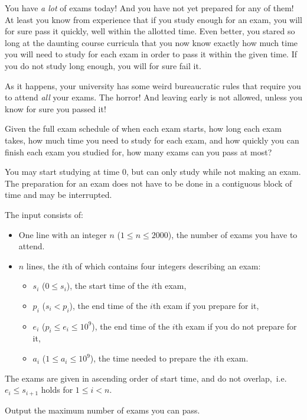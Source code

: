 

\newcommand{\maxn}{2000}
\newcommand{\maxtime}{10^9}
\newcommand{\maxa}{10^9}

You have \emph{a lot} of exams today! And you have not yet prepared for any of them!
At least you know from experience that if you study enough for an exam, you
will for sure pass it quickly, well within the allotted time. Even better, you stared so long
at the daunting course curricula that you now know exactly how much time you will
need to study for each exam in order to pass it within the given time. If
you do not study long enough, you will for sure fail it.

As it happens, your university has some weird bureaucratic rules that require you
to attend \emph{all} your exams. The horror! And leaving early is not allowed,
unless you know for sure you passed it!

Given the full exam schedule of when each exam starts, how long each exam
takes, how much time you need to study for each exam, and how quickly you can
finish each exam you studied for, how many exams can you pass at most?

You may start studying at time $0$, but can only study while not making an exam.
The preparation for an exam does not have to be done in a contiguous block of
time and may be interrupted.

\begin{Input}
    The input consists of:
    \begin{itemize}
        \item One line with an integer \(n\) (\(1 \leq n\leq \maxn\)), the number of exams you have to attend.
		\item \(n\) lines, the \(i\)th of which contains four integers describing an exam:
		\begin{itemize}
			\item \(s_i\) (\(0 \leq s_i\)), the start time of the \(i\)th exam,
			\item \(p_i\) (\(s_i < p_i\)), the end time of the \(i\)th exam if you prepare for it,
			\item \(e_i\) (\(p_i \leq e_i \leq \maxtime\)), the end time of the \(i\)th exam if you do not prepare for it,
			\item \(a_i\) (\(1 \leq a_i \leq \maxa\)), the time needed to prepare the \(i\)th exam.
		\end{itemize}
    \end{itemize}
	The exams are given in ascending order of start time, and do not overlap,~i.e.~\(e_i \leq s_{i+1}\) holds for \(1 \leq i < n\).
\end{Input}

\begin{Output}
	Output the maximum number of exams you can pass.
\end{Output}
